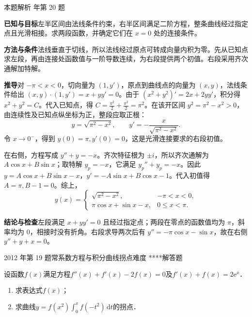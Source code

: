 \documentclass[UTF8,zihao=-4,fontset=fandol]{ctexart}
\newcounter{BankQuestion}
\newcommand{\QuestionPage}[7]{%
  \stepcounter{BankQuestion}%
  \par\noindent\begin{minipage}{\linewidth}
  \raggedright
  {\small\textcolor{black!60}{#3\quad #5\quad 难度 #7}\hfill\textcolor{accent}{#2}}\par\smallskip}
\newcommand{\QuestionEnd}{\end{minipage}\par\medskip}
\newcommand{\QuestionPage}[7]{%
  \clearpage
  \stepcounter{BankQuestion}%
  {\small\textcolor{accent}{#1\hfill #2}}\par\medskip
  {\small\textcolor{black!60}{#3\quad #5\quad 难度 #7\hfill \arabic{BankQuestion} / 234}}\par\vspace{9bp}}
\newcommand{\QuestionEnd}{}
\newenvironment{QuestionSolution}[1]{%
  \clearpage
  {\small\textcolor{black!60}{本题解析\quad #1}}\par\medskip
}{\par\clearpage}
\begin{document}
\begin{QuestionSolution}{2009 年第 20 题}
\textbf{已知与目标}\quad 左半区间由法线条件约束，右半区间满足二阶方程，整条曲线经过指定点且光滑相接。求两段函数，并确定它们在 \(x=0\) 处的连接条件。

\textbf{方法与条件}\quad 法线垂直于切线，所以法线经过原点可转成向量内积为零。先从已知点求左段，再由连接处函数值与一阶导数连续，为右段提供两个初值。右段采用齐次通解加特解。

\textbf{推导}\quad 对 \(-\pi<x<0\)，切向量为 \((1,y')\)，原点到曲线点的向量为 \((x,y)\)，法线条件给出 \((x,y)\cdot(1,y')=x+yy'=0\)。由于 \((x^2+y^2)'=2x+2yy'\)，积分得 \(x^2+y^2=C\)。代入已知点，得 \(C=\frac{\pi^2}{2}+\frac{\pi^2}{2}=\pi^2\)。在该开区间 \(y^2=\pi^2-x^2>0\)，由连续性及已知点纵坐标为正，整段应取正根：
\[
y=\sqrt{\pi^2-x^2},\qquad y'=-\frac{x}{\sqrt{\pi^2-x^2}}.
\]
令 \(x\to0^-\)，得到 \(y(0)=\pi,y'(0)=0\)，这是光滑连接要求的右段初值。

在右侧，方程写成 \(y''+y=-x\)。齐次特征根为 \(\pm i\)，所以齐次通解为 \(A\cos x+B\sin x\)；取特解 \(y_p=-x\)，它满足 \(y_p''+y_p=-x\)。因此 \(y=A\cos x+B\sin x-x\)，\(y'=-A\sin x+B\cos x-1\)。代入初值得 \(A=\pi,B-1=0\)。综上，
\[
\boxed{y(x)=
\begin{cases}
\sqrt{\pi^2-x^2},&-\pi<x<0,\\
\pi\cos x+\sin x-x,&0\le x<\pi.
\end{cases}}
\]

\textbf{结论与检查}\quad 左段满足 \(x+yy'=0\) 且经过指定点；两段在零点的函数值均为 \(\pi\)，斜率均为 \(0\)，相接时没有折角。右段求导两次后有 \(y''=-\pi\cos x-\sin x\)，故在右侧 \(y''+y+x=0\)。
\end{QuestionSolution}

\QuestionPage{4.2 高阶线性微分方程}{解答题}{2012 年第 19 题}{3}{常系数方程与积分曲线拐点}{232 / 234}{****}
设函数$f(x)$满足方程$f''(x) + f'(x) - 2f(x) = 0$及$f'(x) + f(x) = 2\mathrm{e}^x$．
\begin{enumerate}
\item 求表达式$f(x)$；
\item 求曲线$y = f(x^2)\int_0^x f(- t^2)\,\mathrm{d} t$的拐点．
\end{enumerate}
\QuestionEnd
\end{document}
